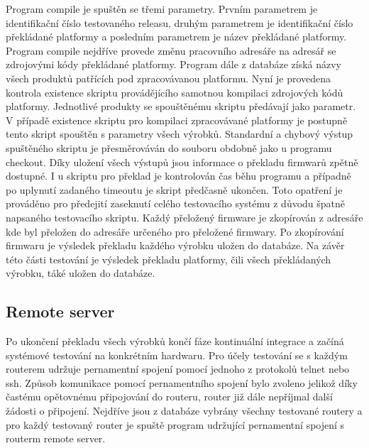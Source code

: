 Program compile je spuštěn se třemi parametry. Prvním parametrem je identifikační číslo testovaného releasu, druhým parametrem je identifikační číslo překládané platformy a posledním parametrem je název překládané platformy. Program compile nejdříve provede změnu pracovního adresáře na adresář se zdrojovými kódy překládané platformy. Program dále z databáze získá názvy všech produktů patřících pod zpracovávanou platformu. Nyní je provedena kontrola existence skriptu provádějícího samotnou kompilaci zdrojových kódů platformy. Jednotlivé produkty se spouštěnému skriptu předávají jako parametr. V případě existence skriptu pro kompilaci zpracovávané platformy je postupně tento skript spouštěn s parametry všech výrobků. Standardní a chybový výstup spuštěného skriptu je přesměrováván do souboru obdobně jako u programu checkout. Díky uložení všech výstupů jsou informace o překladu firmwarů zpětně dostupné. I u skriptu pro překlad je kontrolován čas běhu programu a případně po uplynutí zadaného timeoutu je skript předčasně ukončen. Toto opatření je prováděno pro předejití zaseknutí celého testovacího systému z důvodu špatně napsaného testovacího skriptu. Každý přeložený firmware je zkopírován z adresáře kde byl přeložen do adresáře určeného pro přeložené firmwary. Po zkopírování firmwaru je výsledek překladu každého výrobku uložen do databáze. Na závěr této části testování je výsledek překladu platformy, čili všech překládaných výrobku, táké uložen do databáze.

\subsection{Remote server}
Po ukončení překladu všech výrobků končí fáze kontinuální integrace a začíná systémové testování na konkrétním hardwaru. Pro účely testování se s každým routerem udržuje pernamentní spojení pomocí jednoho z protokolů telnet nebo ssh. Způsob komunikace pomocí pernamentního spojení bylo zvoleno jelikož díky častému opětovnému připojování do routeru, router již dále nepříjmal další žádosti o připojení. Nejdříve jsou z databáze vybrány všechny testované routery a pro každý testovaný router je spuště program udržující pernamentní spojení s routerm remote server.

